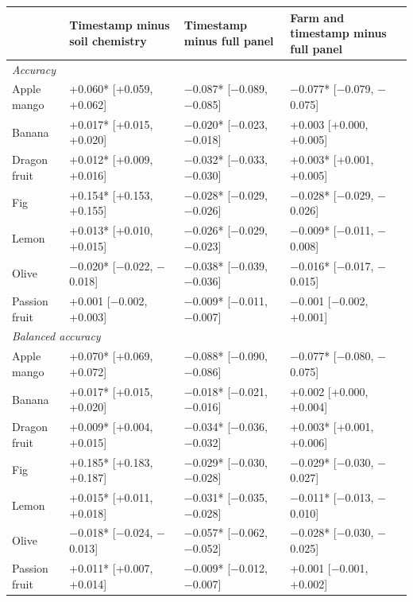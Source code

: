\begin{tabular}{l>{\centering\arraybackslash}p{}>{\centering\arraybackslash}p{}>{\centering\arraybackslash}p{}}
\toprule
 & Timestamp minus soil chemistry & Timestamp minus full panel & Farm and timestamp minus full panel \\
\midrule
\multicolumn{4}{l}{\emph{Accuracy}} \\
Apple mango & +0.060* [+0.059, +0.062] & $-$0.087* [$-$0.089, $-$0.085] & $-$0.077* [$-$0.079, $-$0.075] \\
Banana & +0.017* [+0.015, +0.020] & $-$0.020* [$-$0.023, $-$0.018] & +0.003 [+0.000, +0.005] \\
Dragon fruit & +0.012* [+0.009, +0.016] & $-$0.032* [$-$0.033, $-$0.030] & +0.003* [+0.001, +0.005] \\
Fig & +0.154* [+0.153, +0.155] & $-$0.028* [$-$0.029, $-$0.026] & $-$0.028* [$-$0.029, $-$0.026] \\
Lemon & +0.013* [+0.010, +0.015] & $-$0.026* [$-$0.029, $-$0.023] & $-$0.009* [$-$0.011, $-$0.008] \\
Olive & $-$0.020* [$-$0.022, $-$0.018] & $-$0.038* [$-$0.039, $-$0.036] & $-$0.016* [$-$0.017, $-$0.015] \\
Passion fruit & +0.001 [$-$0.002, +0.003] & $-$0.009* [$-$0.011, $-$0.007] & $-$0.001 [$-$0.002, +0.001] \\
\multicolumn{4}{l}{\emph{Balanced accuracy}} \\
Apple mango & +0.070* [+0.069, +0.072] & $-$0.088* [$-$0.090, $-$0.086] & $-$0.077* [$-$0.080, $-$0.075] \\
Banana & +0.017* [+0.015, +0.020] & $-$0.018* [$-$0.021, $-$0.016] & +0.002 [+0.000, +0.004] \\
Dragon fruit & +0.009* [+0.004, +0.015] & $-$0.034* [$-$0.036, $-$0.032] & +0.003* [+0.001, +0.006] \\
Fig & +0.185* [+0.183, +0.187] & $-$0.029* [$-$0.030, $-$0.028] & $-$0.029* [$-$0.030, $-$0.027] \\
Lemon & +0.015* [+0.011, +0.018] & $-$0.031* [$-$0.035, $-$0.028] & $-$0.011* [$-$0.013, $-$0.010] \\
Olive & $-$0.018* [$-$0.024, $-$0.013] & $-$0.057* [$-$0.062, $-$0.052] & $-$0.028* [$-$0.030, $-$0.025] \\
Passion fruit & +0.011* [+0.007, +0.014] & $-$0.009* [$-$0.012, $-$0.007] & +0.001 [$-$0.001, +0.002] \\
\bottomrule
\end{tabular}
